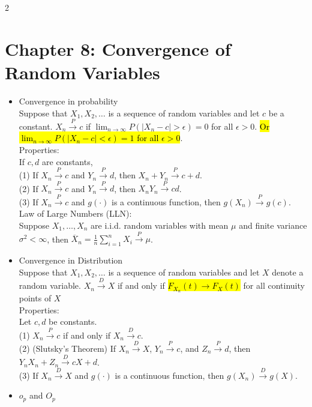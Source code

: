 \documentclass[a4paper,10pt]{article}
\begin{document}
\begin{multicols}{2}
\section*{Chapter 8: Convergence of Random Variables}
\begin{itemize}
    \item Convergence in probability\\
    Suppose that $X_1, X_2, \ldots$ is a sequence of random variables and let $c$ be a constant. $X_n \overset{P}{\to} c$ if  
    $ \lim_{n \to \infty} P(|X_n - c| > \epsilon) = 0 $  
    for all $\epsilon > 0$. \hl{Or 
    $ \lim_{n \to \infty} P(|X_n - c| < \epsilon) = 1 $  
    for all $\epsilon > 0$}. \\
    Properties:\\ If $c, d$ are constants,\\
    (1) If $X_n \overset{P}{\to} c$ and $Y_n \overset{P}{\to} d$, then $X_n + Y_n \overset{P}{\to} c + d$.\\  
    (2) If $X_n \overset{P}{\to} c$ and $Y_n \overset{P}{\to} d$, then $X_n Y_n \overset{P}{\to} cd$. \\ 
    (3) If $X_n \overset{P}{\to} c$ and $g(\cdot)$ is a continuous function, then $g(X_n) \overset{P}{\to} g(c)$.\\
    Law of Large Numbers (LLN):\\ Suppose $X_1, \ldots, X_n$ are i.i.d. random variables with mean $\mu$ and finite variance $\sigma^2 < \infty$, then  
    $ \overline{X}_n = \frac{1}{n} \sum_{i=1}^n X_i \overset{P}{\to} \mu $.
    \item Convergence in Distribution\\
    Suppose that $X_1, X_2, \ldots$ is a sequence of random variables and let $X$ denote a random variable. $X_n \overset{D}{\to} X$ if and only if  
    \hl{$ F_{X_n}(t) \to F_X(t) $}  for all continuity points of $X$ \\
    Properties:\\
    Let $c, d$ be constants.\\  
    (1) $X_n \overset{P}{\to} c$ if and only if $X_n \overset{D}{\to} c$.\\
    (2) (Slutsky's Theorem) If $X_n \overset{D}{\to} X$, $Y_n \overset{P}{\to} c$, and $Z_n \overset{P}{\to} d$, then $Y_n X_n + Z_n \overset{D}{\to} cX + d$.\\
    (3) If $X_n \overset{D}{\to} X$ and $g(\cdot)$ is a continuous function, then $g(X_n) \overset{D}{\to} g(X)$.
    \item $o_p$ and $O_p$\\

\end{itemize}
\end{multicols}
\end{document}
